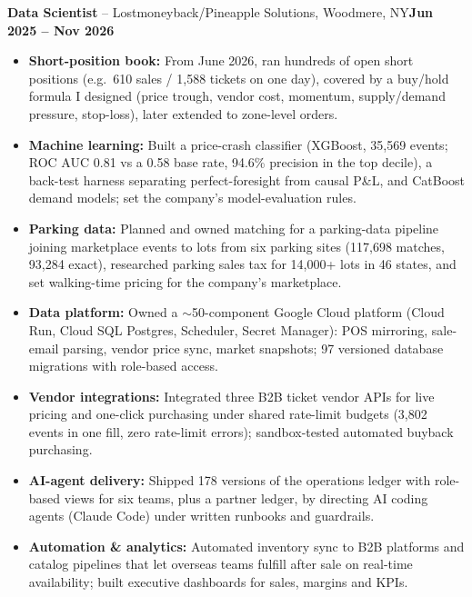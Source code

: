 \documentclass[10pt,letterpaper]{article}
\newcommand{\role}[3]{\textbf{#1} -- #2\hfill\textbf{#3}\par\vspace{1pt}}
\newcommand{\lead}[1]{\textbf{#1:}}
\begin{document}
\role{Data Scientist}{Lostmoneyback/Pineapple Solutions, Woodmere, NY}{Jun 2025 -- Nov 2026}
\begin{itemize}
  \item \lead{Short-position book} From June 2026, ran hundreds of open short positions (e.g.\ 610 sales / 1,588
        tickets on one day), covered by a buy/hold formula I designed (price trough, vendor cost, momentum,
        supply/demand pressure, stop-loss), later extended to zone-level orders.
  \item \lead{Machine learning} Built a price-crash classifier (XGBoost, 35,569 events; ROC AUC 0.81 vs a 0.58 base
        rate, 94.6\% precision in the top decile), a back-test harness separating perfect-foresight from causal
        P\&L, and CatBoost demand models; set the company's model-evaluation rules.
  \item \lead{Parking data} Planned and owned matching for a parking-data pipeline joining marketplace events to lots
        from six parking sites (117,698 matches, 93,284 exact), researched parking sales tax for 14,000+ lots in 46
        states, and set walking-time pricing for the company's marketplace.
  \item \lead{Data platform} Owned a $\sim$50-component Google Cloud platform (Cloud Run, Cloud SQL Postgres,
        Scheduler, Secret Manager): POS mirroring, sale-email parsing, vendor price sync, market snapshots; 97
        versioned database migrations with role-based access.
  \item \lead{Vendor integrations} Integrated three B2B ticket vendor APIs for live pricing and one-click purchasing
        under shared rate-limit budgets (3,802 events in one fill, zero rate-limit errors); sandbox-tested automated
        buyback purchasing.
  \item \lead{AI-agent delivery} Shipped 178 versions of the operations ledger with role-based views for six teams,
        plus a partner ledger, by directing AI coding agents (Claude Code) under written runbooks and guardrails.
  \item \lead{Automation \& analytics} Automated inventory sync to B2B platforms and catalog pipelines that let
        overseas teams fulfill after sale on real-time availability; built executive dashboards for sales, margins
        and KPIs.
\end{itemize}
\end{document}
